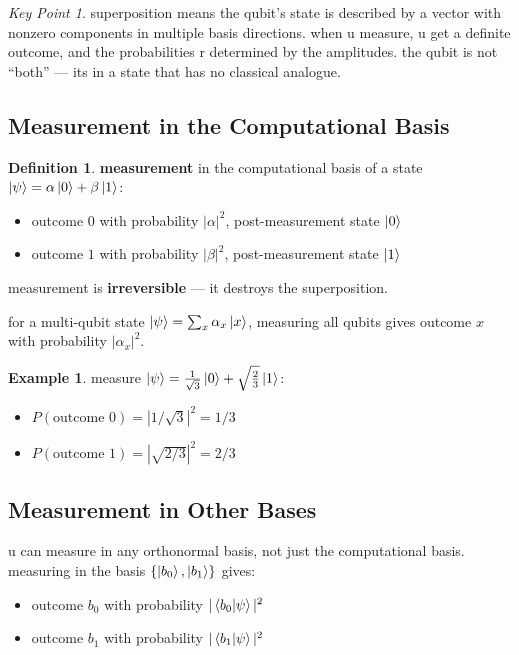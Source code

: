 \documentclass[11pt,a4paper]{article}
\theoremstyle{definition}
\newtheorem{definition}{Definition}[section]
\newtheorem{example}{Example}[section]
\theoremstyle{remark}
\newtheorem*{keypoint}{Key Point}
\begin{document}
\begin{keypoint}
superposition means the qubit's state is described by a vector with nonzero components in multiple basis directions. when u measure, u get a definite outcome, and the probabilities r determined by the amplitudes. the qubit is not ``both'' --- its in a state that has no classical analogue.
\end{keypoint}

\subsection{Measurement in the Computational Basis}

\begin{definition}
\textbf{measurement} in the computational basis of a state $\ket{\psi} = \alpha\ket{0} + \beta\ket{1}$:
\begin{itemize}
    \item outcome $0$ with probability $|\alpha|^2$, post-measurement state $\ket{0}$
    \item outcome $1$ with probability $|\beta|^2$, post-measurement state $\ket{1}$
\end{itemize}
measurement is \textbf{irreversible} --- it destroys the superposition.
\end{definition}

for a multi-qubit state $\ket{\psi} = \sum_x \alpha_x \ket{x}$, measuring all qubits gives outcome $x$ with probability $|\alpha_x|^2$.

\begin{example}
measure $\ket{\psi} = \frac{1}{\sqrt{3}}\ket{0} + \sqrt{\frac{2}{3}}\ket{1}$:
\begin{itemize}
    \item $P(\text{outcome } 0) = |1/\sqrt{3}|^2 = 1/3$
    \item $P(\text{outcome } 1) = |\sqrt{2/3}|^2 = 2/3$
\end{itemize}
\end{example}

\subsection{Measurement in Other Bases}

u can measure in any orthonormal basis, not just the computational basis. measuring in the basis $\{\ket{b_0}, \ket{b_1}\}$ gives:
\begin{itemize}
    \item outcome $b_0$ with probability $|\braket{b_0|\psi}|^2$
    \item outcome $b_1$ with probability $|\braket{b_1|\psi}|^2$
\end{itemize}
\end{document}
